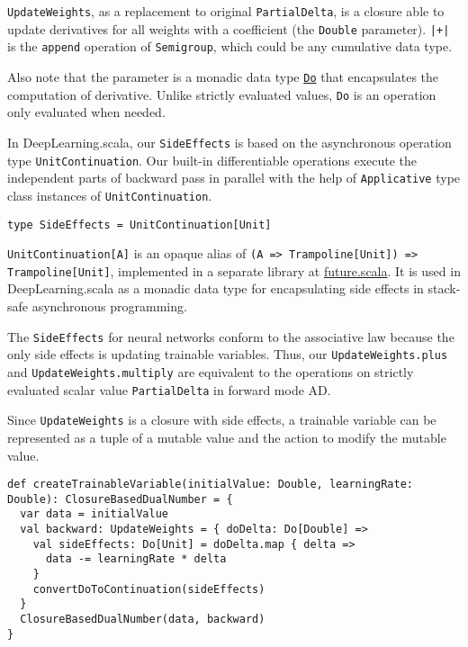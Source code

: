 \lstinline{UpdateWeights}, as a replacement to original \lstinline{PartialDelta}, is a closure able to update derivatives for all weights with a coefficient (the \lstinline{Double} parameter).
\lstinline{|+|} is the \lstinline{append} operation of \lstinline{Semigroup}, which could be any cumulative data type.

Also note that the parameter is a monadic data type \href{https://javadoc.io/page/com.thoughtworks.raii/asynchronous_2.11/latest/com/thoughtworks/raii/asynchronous%24%24Do.html}{\lstinline{Do}} that encapsulates the computation of derivative. Unlike strictly evaluated values, \lstinline{Do} is an operation only evaluated when needed.

In DeepLearning.scala, our \lstinline{SideEffects} is based on the asynchronous operation type \texttt{UnitContinuation}. Our built-in differentiable operations execute the independent parts of backward pass in parallel with the help of \lstinline{Applicative} type class instances of \texttt{UnitContinuation}.

\begin{lstlisting}[float={h t b p},caption={Monadic side-effects}, label={SideEffects}]
type SideEffects = UnitContinuation[Unit]
\end{lstlisting}

\lstinline{UnitContinuation[A]} is an opaque alias\cite{erik2017opaque} of \lstinline{(A => Trampoline[Unit]) => Trampoline[Unit]}, implemented in a separate library at \href{https://github.com/ThoughtWorksInc/future.scala}{future.scala}. It is used in DeepLearning.scala as a monadic data type for encapsulating side effects in stack-safe asynchronous programming.

The \lstinline{SideEffects} for neural networks conform to the associative law because the only side effects is updating \glspl{trainable variable}. Thus, our \lstinline{UpdateWeights.plus} and \lstinline{UpdateWeights.multiply} are equivalent to the operations on strictly evaluated scalar value \lstinline{PartialDelta} in forward mode AD.

Since \lstinline{UpdateWeights} is a closure with side effects, a \gls{trainable variable} can be represented as a tuple of a mutable value and the action to modify the mutable value.

\begin{lstlisting}[float={h t b p},caption={Create a dual number for a \gls{trainable variable}}, label={createTrainableVariable}]
def createTrainableVariable(initialValue: Double, learningRate: Double): ClosureBasedDualNumber = {
  var data = initialValue
  val backward: UpdateWeights = { doDelta: Do[Double] =>
    val sideEffects: Do[Unit] = doDelta.map { delta =>
      data -= learningRate * delta
    }
    convertDoToContinuation(sideEffects)
  }
  ClosureBasedDualNumber(data, backward)
}
\end{lstlisting}


